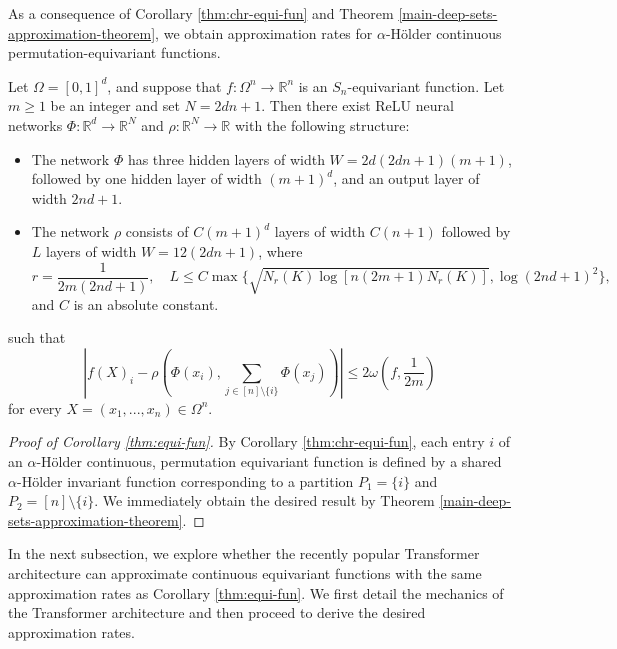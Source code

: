 \documentclass[twoside,11pt]{article}
\newcommand{\ah}{$\alpha$-H\"older }
\begin{document}
As a consequence of Corollary \ref{thm:chr-equi-fun} and Theorem \ref{main-deep-sets-approximation-theorem}, we obtain approximation rates for \ah continuous permutation-equivariant functions.
\begin{cor}\label{thm:equi-fun}
    Let $\Omega = [0,1]^d$, and suppose that $f:\Omega^n\rightarrow \mathbb{R}^n$ is an $S_n$-equivariant function. Let $m \geq 1$ be an integer and set $N = 2dn+1$. Then there exist ReLU neural networks $\Phi:\mathbb{R}^d\rightarrow \mathbb{R}^N$ and $\rho:\mathbb{R}^N\rightarrow \mathbb{R}$ with the following structure:
    \begin{itemize}
        \item The network $\Phi$ has three hidden layers of width $W = 2d(2dn+1)(m+1)$, followed by one hidden layer of width $(m+1)^d$, and an output layer of width $2nd+1$.
		\item The network $\rho$ consists of $C(m+1)^d$ layers of width $C(n+1)$ followed by $L$ layers of width $W = 12(2dn+1)$, where
		$$r = \frac{1}{2m(2nd+1)}, \quad L \leq C\max\{\sqrt{N_r(K)\log[n(2m+1)N_r(K)]},\log(2nd+1)^2\},$$
	and $C$ is an absolute constant.
    \end{itemize}
    such that
    \begin{equation}\label{deep-sets-equation-bound-snir}
        \left|f(X)_i - \rho\left(\Phi(x_i),\sum_{j\in [n]\setminus \{i\}}\Phi(x_j)\right)\right| \leq 2\omega\left(f,\frac{1}{2m}\right)
    \end{equation}
    for every $X = (x_1,...,x_n)\in \Omega^n$. 
\end{cor}

\begin{proof}[Proof of Corollary \ref{thm:equi-fun}]
By Corollary \ref{thm:chr-equi-fun}, each entry $i$ of an \ah continuous, permutation equivariant function is defined by a shared \ah invariant function corresponding to a partition $P_1=\{i\}$ and  $P_2=[n]\setminus\{i\}$. We immediately obtain the desired result by Theorem \ref{main-deep-sets-approximation-theorem}.   
\end{proof}

In the next subsection, we explore whether the recently popular Transformer \cite{vaswani2017attention} architecture can approximate continuous equivariant functions with the same approximation rates as Corollary \ref{thm:equi-fun}. We first detail the mechanics of the Transformer architecture and then proceed to derive the desired approximation rates.
\end{document}
